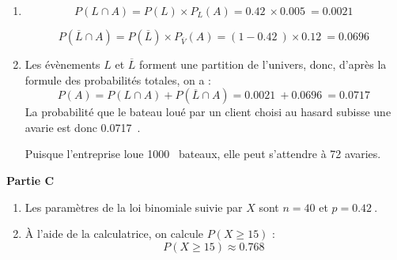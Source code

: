 \documentclass[10pt]{article}
\providecommand{\np}[2][]{{#2~#1}}
\begin{document}
\begin{enumerate}
	\item \[P\left(L \cap A\right) = P(L) \times P_{L}(A) = \np{0.42} \times \np{0.005} = \boxed{\np{0.0021}}\]
	\smallskip
	
	\[P\left(\overline{L} \cap A\right) = P\left(\overline{L}\right) \times P_{\overline{V}}(A) = (1-\np{0.42}) \times \np{0.12} = \boxed{\np{0.0696}}\]
	\item Les évènements $L$ et $\overline{L}$ forment une partition de l'univers, donc, d'après la formule des probabilités totales, on a :
	\[P(A) = P\left(L \cap A\right) + P\left(\overline{L} \cap A\right) = \np{0.0021} + \np{0.0696} = \np{0.0717}\]
La probabilité que le bateau loué par un client choisi au hasard subisse une avarie est donc \np{0.0717}.
	
Puisque l'entreprise loue \np{1000} bateaux, elle peut s'attendre à 72 avaries.
\end{enumerate}

\medskip

\textbf{Partie C}

\medskip

\begin{enumerate}
	\item Les paramètres de la loi binomiale suivie par $X$ sont $\boxed{n=40}$ et $\boxed{p=\np{0.42}}$.
	\item À l'aide de la calculatrice, on calcule $P(X \geqslant 15)$ :
	\[\boxed{P(X \geqslant 15) \approx \np{0.768}}\]
\end{enumerate}

\bigskip
\end{document}

